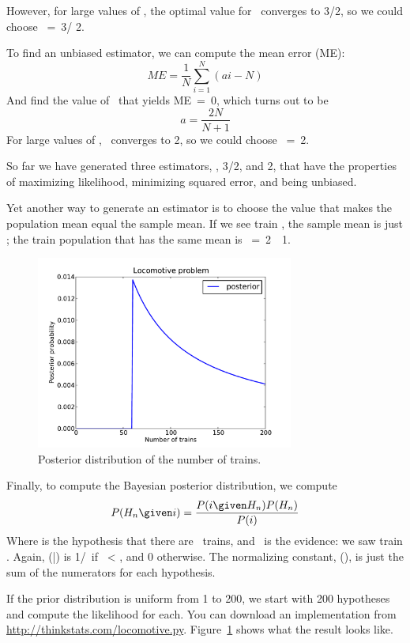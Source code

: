 \documentclass[12pt]{book}
\begin{document}
However, for large values of \N, the optimal value for \mya~converges
to 3/2, so we could choose \mynhat~=~3\ii / 2.

To find an unbiased estimator, we can compute the mean error (ME):
%
\[ ME = \frac{1}{N} \sum_{i=1}^N (ai - N) \]
%
And find the value of \mya~that yields ME~=~0, which turns out to be
%
\[ a = \frac{2N}{N+1}\]
%
For large values of \N, \mya~converges to 2, so we could choose
\mynhat~=~2\ii.

So far we have generated three estimators, \ii, 3\ii/2, and 2\ii,
that have the properties of maximizing likelihood, minimizing squared
error, and being unbiased.

Yet another way to generate an estimator is to choose the value
that makes the population mean equal the sample mean.  If we see train
\ii, the sample mean is just \ii; the train population that has the
same mean is \mynhat~=~2\ii~\minus~1.

\begin{figure}
\centerline{\includegraphics[height=2.5in]{figs/locomotive.pdf}}
\caption{Posterior distribution of the number of trains.}
\label{locomotive}
\end{figure}

Finally, to compute the Bayesian posterior distribution, we compute
%
\[ P(H_n \given i) = \frac{P(i \given H_n) P(H_n)}{P(i)} \]
%
Where \HH{} is the hypothesis that there are \n~trains, and \ii~is
the evidence: we saw train \ii.  Again, \Prob(\ii|\HH{})
is 1/\n~if \ii~< \n, and 0 otherwise.  The normalizing constant,
\Prob(\ii), is just the sum of the numerators for each hypothesis.

If the prior distribution is uniform from 1 to 200, we start with 200
hypotheses and compute the likelihood for each.  You can download an
implementation from
\url{http://thinkstats.com/locomotive.py}.  Figure~\ref{locomotive} shows
what the result looks like.
\end{document}
